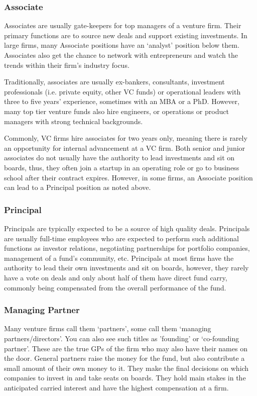 \documentclass[a4paper]{article}
\begin{document}
{\subsubsection{Associate}
Associates are usually gate-keepers for top managers of a venture firm. Their primary functions are to source new deals and support existing investments. In large firms, many Associate positions have an ‘analyst’ position below them. Associates also get the chance to network with entrepreneurs and watch the trends within their firm’s industry focus.

\vspace{5pt}
\noindent Traditionally, associates are usually ex-bankers, consultants, investment professionals (i.e. private equity, other VC funds) or operational leaders with three to five years’ experience, sometimes with an MBA or a PhD. However, many top tier venture funds also hire engineers, or operations or product managers with strong technical backgrounds.

\vspace{5pt}
\noindent Commonly, VC firms hire associates for two years only, meaning there is rarely an opportunity for internal advancement at a VC firm. Both senior and junior associates do not usually have the authority to lead investments and sit on boards, thus, they often join a startup in an operating role or go to business school after their contract expires. However, in some firms, an Associate position can lead to a Principal position as noted above.

\subsubsection{Principal}
Principals are typically expected to be a source of high quality deals. Principals are usually full-time employees who are expected to perform such additional functions as investor relations, negotiating partnerships for portfolio companies, management of a fund’s community, etc. Principals at most firms have the authority to lead their own investments and sit on boards, however, they rarely have a vote on deals and only about half of them have direct fund carry, commonly being compensated from the overall performance of the fund.

\subsubsection{Managing Partner} 
Many venture firms call them ‘partners’, some call them ‘managing partners/directors’. You can also see such titles as ’founding’ or ‘co-founding partner’. These are the true GPs of the firm who may also have their names on the door. General partners raise the money for the fund, but also contribute a small amount of their own money to it. They make the final decisions on which companies to invest in and take seats on boards. They hold main stakes in the anticipated carried interest and have the highest compensation at a firm. 

}
\end{document}
